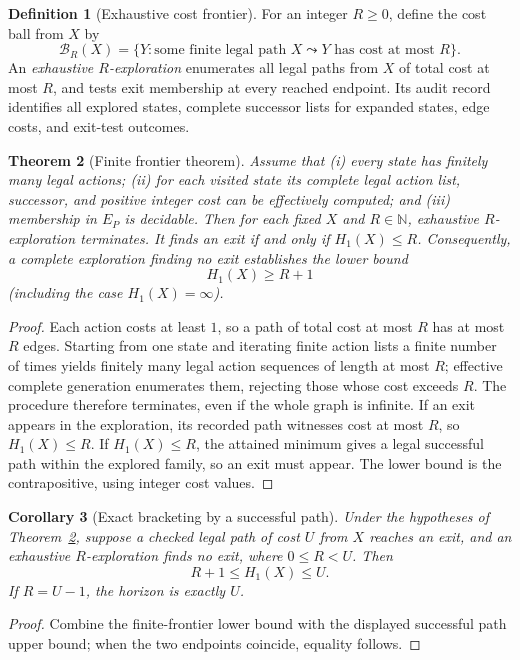 \documentclass[11pt,letterpaper]{article}
\newtheorem{theorem}{Theorem}[section]
\newtheorem{corollary}[theorem]{Corollary}
\theoremstyle{definition}
\newtheorem{definition}[theorem]{Definition}
\theoremstyle{remark}
\newcommand{\Exit}{E_{P}}
\newcommand{\Hone}{H_{1}}
\begin{document}
\begin{definition}[Exhaustive cost frontier]
For an integer $R\ge0$, define the cost ball from $X$ by
\[
 \mathcal B_R(X)=\{Y:\text{some finite legal path $X\leadsto Y$ has cost at most $R$}\}.
\]
An \emph{exhaustive $R$-exploration} enumerates all legal paths from $X$ of total cost at most $R$, and tests exit membership at every reached endpoint. Its audit record identifies all explored states, complete successor lists for expanded states, edge costs, and exit-test outcomes.
\end{definition}

\begin{theorem}[Finite frontier theorem]\label{thm:B_cutoff}
Assume that (i) every state has finitely many legal actions; (ii) for each visited state its \emph{complete} legal action list, successor, and positive integer cost can be effectively computed; and (iii) membership in $\Exit$ is decidable. Then for each fixed $X$ and $R\in\mathbb N$, exhaustive $R$-exploration terminates. It finds an exit if and only if $\Hone(X)\le R$. Consequently, a complete exploration finding no exit establishes the lower bound
\[
 \Hone(X)\ge R+1
\]
(including the case $\Hone(X)=\infty$).
\end{theorem}
\begin{proof}
Each action costs at least $1$, so a path of total cost at most $R$ has at most $R$ edges. Starting from one state and iterating finite action lists a finite number of times yields finitely many legal action sequences of length at most $R$; effective complete generation enumerates them, rejecting those whose cost exceeds $R$. The procedure therefore terminates, even if the whole graph is infinite. If an exit appears in the exploration, its recorded path witnesses cost at most $R$, so $\Hone(X)\le R$. If $\Hone(X)\le R$, the attained minimum gives a legal successful path within the explored family, so an exit must appear. The lower bound is the contrapositive, using integer cost values.
\end{proof}

\begin{corollary}[Exact bracketing by a successful path]\label{cor:B_bracket}
Under the hypotheses of Theorem~\ref{thm:B_cutoff}, suppose a checked legal path of cost $U$ from $X$ reaches an exit, and an exhaustive $R$-exploration finds no exit, where $0\le R<U$. Then
\[
 R+1\le \Hone(X)\le U.
\]
If $R=U-1$, the horizon is exactly $U$.
\end{corollary}
\begin{proof}
Combine the finite-frontier lower bound with the displayed successful path upper bound; when the two endpoints coincide, equality follows.
\end{proof}
\end{document}
